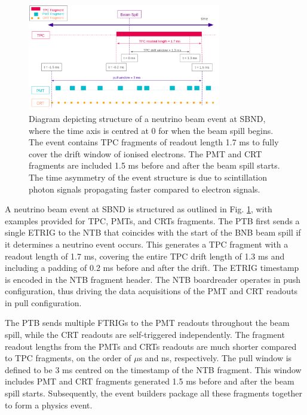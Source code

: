 \begin{figure}[htbp!] 
\centering    
\includegraphics[width=0.75\textwidth]{SBND_Event_Structure}
\caption[SBNDEventStructure]{
Diagram depicting structure of a neutrino beam event at SBND, where the time axis is centred at 0 for when the beam spill begins. 
The event contains TPC fragments of readout length 1.7 ms to fully cover the drift window of ionised electrons. 
The PMT and CRT fragments are included 1.5 ms before and after the beam spill starts. 
The time asymmetry of the event structure is due to scintillation photon signals propagating faster compared to electron signals.}
\label{fig:SBNDEventStructure}
\end{figure}

A neutrino beam event at SBND is structured as outlined in Fig. \ref{fig:SBNDEventStructure}, with examples provided for TPC, PMTs, and CRTs fragments.
The PTB first sends a single ETRIG to the NTB that coincides with the start of the BNB beam spill if it determines a neutrino event occurs. 
This generates a TPC fragment with a readout length of 1.7 ms, covering the entire TPC drift length of 1.3 ms and including a padding of 0.2 ms before and after the drift. 
The ETRIG timestamp is encoded in the NTB fragment header.
The NTB boardreader operates in push configuration, thus driving the data acquisitions of the PMT and CRT readouts in pull configuration.

The PTB sends multiple FTRIGs to the PMT readouts throughout the beam spill, while the CRT readouts are self-triggered independently. 
The fragment readout lengths from the PMTs and CRTs readouts are much shorter compared to TPC fragments, on the order of $\mu$s and ns, respectively.
The pull window is defined to be 3 ms centred on the timestamp of the NTB fragment. 
This window includes PMT and CRT fragments generated 1.5 ms before and after the beam spill starts. 
Subsequently, the event builders package all these fragments together to form a physics event.

